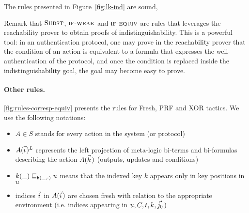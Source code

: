 \begin{lemma}
  The rules presented in Figure~\ref{fig:lk-ind} are sound, 
\end{lemma}

Remark that $\textsc{Subst}$,  $\textsc{if-weak}$ and $\textsc{if-equiv}$ are rules that leverages the reachability prover to obtain proofs of indistinguishability. This is a powerful tool: in an authentication protocol, one may prove in the reachability prover that the condition of an action is equivalent to a formula that expresses the well-authentication of the protocol, and once the condition is replaced inside the indistinguishability goal, the goal may become easy to prove.

\paragraph{Other rules.}

\cref{fig:rules-corresp-equiv} presents the rules for Fresh, PRF and XOR tactics.
We use the following notations:
\begin{itemize}
\item $A \in S$ stands for every action in the system (or protocol)
\item $A(\pvec i)^L$ represents the left projection of meta-logic bi-terms and bi-formulas describing the action $A(\pvec k)$ (outputs, updates and conditions)
\item $k(\_) \sqsubseteq_{\mathsf{h}(\_,\cdot)} u$ means that the indexed key $k$ appears only in key positions in $u$
\item indices $\pvec i$ in $A(\pvec i)$ are chosen fresh with relation to the appropriate environment (i.e. indices appearing in $u, C, t, k, \pvec {j_0}$)
\end{itemize}

